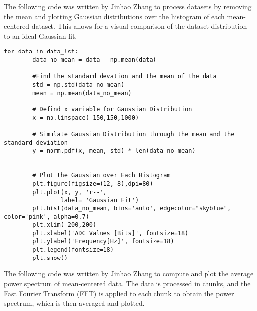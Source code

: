 \documentclass[10pt, preprint]{aastex}
\begin{document}
The following code was written by Jinhao Zhang to process datasets by removing the mean and plotting Gaussian distributions over the histogram of each mean-centered dataset. This allows for a visual comparison of the dataset distribution to an ideal Gaussian fit.

\begin{verbatim}
for data in data_lst:
        data_no_mean = data - np.mean(data)

        #Find the standard devation and the mean of the data
        std = np.std(data_no_mean)
        mean = np.mean(data_no_mean)

        # Defind x variable for Gaussian Distribution
        x = np.linspace(-150,150,1000)

        # Simulate Gaussian Distribution through the mean and the standard deviation
        y = norm.pdf(x, mean, std) * len(data_no_mean)


        # Plot the Gaussian over Each Histogram
        plt.figure(figsize=(12, 8),dpi=80)
        plt.plot(x, y, 'r--', 
                label= 'Gaussian Fit')
        plt.hist(data_no_mean, bins='auto', edgecolor="skyblue", color='pink', alpha=0.7)
        plt.xlim(-200,200)
        plt.xlabel('ADC Values [Bits]', fontsize=18)
        plt.ylabel('Frequency[Hz]', fontsize=18)
        plt.legend(fontsize=18)
        plt.show()
\end{verbatim}
The following code was written by Jinhao Zhang to compute and plot the average power spectrum of mean-centered data. The data is processed in chunks, and the Fast Fourier Transform (FFT) is applied to each chunk to obtain the power spectrum, which is then averaged and plotted.
\end{document}
